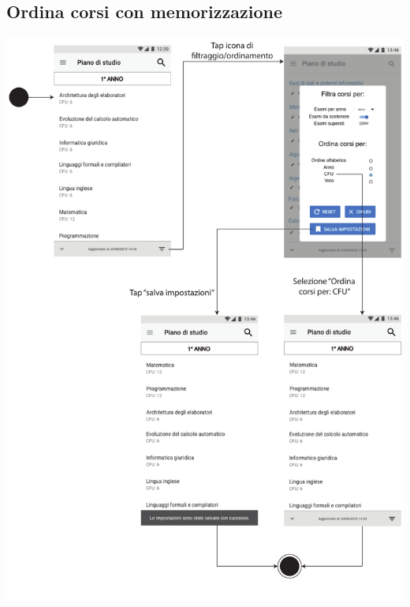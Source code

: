 
\subsection{Ordina corsi con memorizzazione}
\begin{center}
	\includegraphics[width=6in]{imgs/gruppo1/activity_diagrams/AD4_ordina_corsi.pdf}
\end{center}
\newpage


